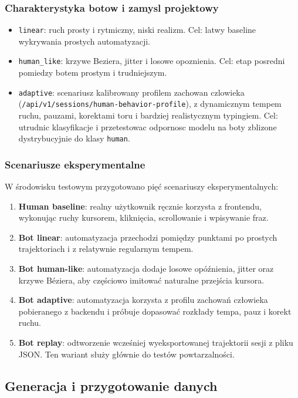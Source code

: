 \subsubsection{Charakterystyka botow i zamysl projektowy}
\begin{itemize}
  \item \texttt{linear}: ruch prosty i rytmiczny, niski realizm.
  Cel: latwy baseline wykrywania prostych automatyzacji.
  \item \texttt{human\_like}: krzywe Beziera, jitter i losowe opoznienia.
  Cel: etap posredni pomiedzy botem prostym i trudniejszym.
  \item \texttt{adaptive}: scenariusz kalibrowany profilem zachowan czlowieka
  (\texttt{/api/v1/sessions/human-behavior-profile}), z dynamicznym tempem ruchu,
  pauzami, korektami toru i bardziej realistycznym typingiem.
  Cel: utrudnic klasyfikacje i przetestowac odpornosc modelu na boty
  zblizone dystrybucyjnie do klasy \texttt{human}.
\end{itemize}

\subsubsection{Scenariusze eksperymentalne}
W środowisku testowym przygotowano pięć scenariuszy eksperymentalnych:
\begin{enumerate}
  \item \textbf{Human baseline}: realny użytkownik ręcznie korzysta z frontendu,
  wykonując ruchy kursorem, kliknięcia, scrollowanie i wpisywanie fraz.
  \item \textbf{Bot linear}: automatyzacja przechodzi pomiędzy punktami po prostych
  trajektoriach i z relatywnie regularnym tempem.
  \item \textbf{Bot human-like}: automatyzacja dodaje losowe opóźnienia, jitter oraz
  krzywe Béziera, aby częściowo imitować naturalne przejścia kursora.
  \item \textbf{Bot adaptive}: automatyzacja korzysta z profilu zachowań człowieka
  pobieranego z backendu i próbuje dopasować rozkłady tempa, pauz i korekt ruchu.
  \item \textbf{Bot replay}: odtworzenie wcześniej wyeksportowanej trajektorii sesji
  z pliku JSON. Ten wariant służy głównie do testów powtarzalności.
\end{enumerate}

\subsection{Generacja i przygotowanie danych}
